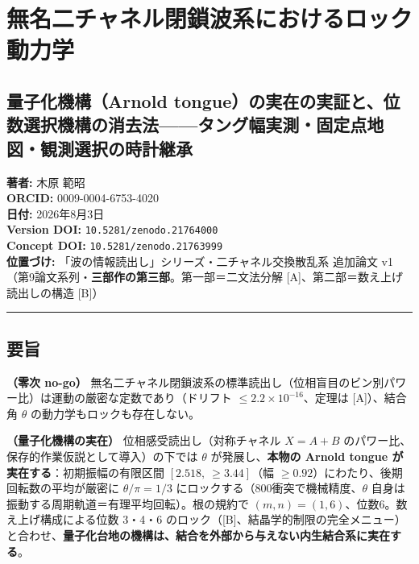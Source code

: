 \documentclass[
  a4paper,
]{ltjsarticle}
\author{}
\date{}
\begin{document}
\section{無名二チャネル閉鎖波系におけるロック動力学}\label{ux7121ux540dux4e8cux30c1ux30e3ux30cdux30ebux9589ux9396ux6ce2ux7cfbux306bux304aux3051ux308bux30edux30c3ux30afux52d5ux529bux5b66}

\subsection{量子化機構（Arnold
tongue）の実在の実証と、位数選択機構の消去法------タング幅実測・固定点地図・観測選択の時計継承}\label{ux91cfux5b50ux5316ux6a5fux69cbarnold-tongueux306eux5b9fux5728ux306eux5b9fux8a3cux3068ux4f4dux6570ux9078ux629eux6a5fux69cbux306eux6d88ux53bbux6cd5ux30bfux30f3ux30b0ux5e45ux5b9fux6e2cux56faux5b9aux70b9ux5730ux56f3ux89b3ux6e2cux9078ux629eux306eux6642ux8a08ux7d99ux627f}

\textbf{著者:} 木原 範昭\\
\textbf{ORCID:} 0009-0004-6753-4020\\
\textbf{日付:} 2026年8月3日\\
\textbf{Version DOI:} \texttt{10.5281/zenodo.21764000}\\
\textbf{Concept DOI:} \texttt{10.5281/zenodo.21763999}\\
\textbf{位置づけ:} 「波の情報読出し」シリーズ・二チャネル交換散乱系
追加論文 v1（第9論文系列・\textbf{三部作の第三部}。第一部＝二文法分解
{[}A{]}、第二部＝数え上げ読出しの構造 {[}B{]}）

\begin{center}\rule{0.5\linewidth}{0.5pt}\end{center}

\subsection{要旨}\label{ux8981ux65e8}

\textbf{（零次 no-go）}
無名二チャネル閉鎖波系の標準読出し（位相盲目のビン別パワー比）は運動の厳密な定数であり（ドリフト
\(\le2.2\times10^{-16}\)、定理は {[}A{]}）、結合角 \(\theta\)
の動力学もロックも存在しない。

\textbf{（量子化機構の実在）} 位相感受読出し（対称チャネル \(X=A+B\)
のパワー比、保存的作業仮説として導入）の下では \(\theta\)
が発展し、\textbf{本物の Arnold tongue が実在する}：初期振幅の有限区間
\([2.518,\ \ge3.44]\)（幅
\(\ge0.92\)）にわたり、後期回転数の平均が厳密に \(\theta/\pi=1/3\)
にロックする（800衝突で機械精度、\(\theta\)
自身は振動する周期軌道＝有理平均回転）。根の規約で
\((m,n)=(1,6)\)、位数6。数え上げ構成による位数 3・4・6
のロック（{[}B{]}、結晶学的制限の完全メニュー）と合わせ、\textbf{量子化台地の機構は、結合を外部から与えない内生結合系に実在する}。
\end{document}
